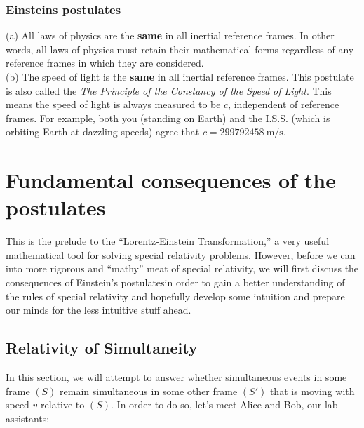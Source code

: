 \documentclass[a4paper,11pt]{article}
\numberwithin{equation}{section}
\begin{document}
 \subsubsection{Einsteins postulates}
 (a) All laws of physics are the \textbf{same} in all inertial reference frames. In other words, all laws of physics must retain their mathematical forms regardless of any reference frames in which they are considered.\smallskip\\
 (b) The speed of light is the \textbf{same} in all inertial reference frames. This postulate is also called the \textit{The Principle of the Constancy of the Speed of Light}. This means the speed of light is always measured to be $c$, independent of reference frames. For example, both you (standing on Earth) and the I.S.S. (which is orbiting Earth at dazzling speeds) agree that $c=\SI{299 792 458}{\meter\per\second}$. 
 \section{Fundamental consequences of the postulates} 
 This is the prelude to the ``Lorentz-Einstein Transformation,'' a very useful mathematical tool for solving special relativity problems. However, before we can into more rigorous and ``mathy'' meat of special relativity, we will first discuss the consequences of Einstein's postulates\textemdash in order to gain a better understanding of the rules of special relativity and hopefully develop some intuition and prepare our minds for the less intuitive stuff ahead.  
 \subsection{Relativity of Simultaneity}
 In this section, we will attempt to answer whether simultaneous events in some frame $(S)$ remain simultaneous in some other frame $(S')$ that is moving with speed $v$ relative to $(S)$. In order to do so, let's meet Alice and Bob, our lab assistants:
 \begin{figure}[htb]
 \centering
 \end{figure}
\end{document}
